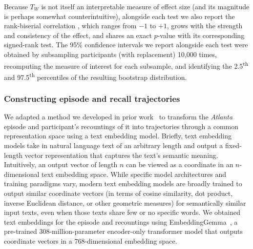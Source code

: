 \documentclass[10pt]{article}
\begin{document}
Because $T_W$ is not itself an interpretable measure of effect size (and its magnitude is perhaps somewhat counterintuitive), alongside each test we also report the rank-biserial correlation \citep[computed as $\frac{W^+ - W^-}{W^+ + W^-}$;][]{Kerb14}, which ranges from $-1$ to $+1$, grows with the strength and consistency of the effect, and shares an exact $p$-value with its corresponding signed-rank test.
The 95\% confidence intervals we report alongside each test were obtained by subsampling participants (with replacement) 10,000 times, recomputing the measure of interest for each subsample, and identifying the 2.5\textsuperscript{th} and 97.5\textsuperscript{th} percentiles of the resulting bootstrap distribution.


\subsubsection*{Constructing episode and recall trajectories}\label{subsec:text-embedding}

We adapted a method we developed in prior work~\citep{HeusEtal21} to transform the \textit{Atlanta} episode and participant's recountings of it into trajectories through a common representation space using a text embedding model.
Briefly, text embedding models take in natural language text of an arbitrary length and output a fixed-length vector representation that captures the text's semantic meaning.
Intuitively, an output vector of length $n$ can be viewed as a coordinate in an $n$-dimensional text embedding space.
While specific model architectures and training paradigms vary, modern text embedding models are broadly trained to output similar coordinate vectors (in terms of cosine similarity, dot product, inverse Euclidean distance, or other geometric measures) for semantically similar input texts, even when those texts share few or no specific words.
We obtained text embeddings for the episode and recountings using EmbeddingGemma~\citep{VeraEtal25}, a pre-trained 308-million-parameter encoder-only transformer model that outputs coordinate vectors in a 768-dimensional embedding space.
\end{document}
